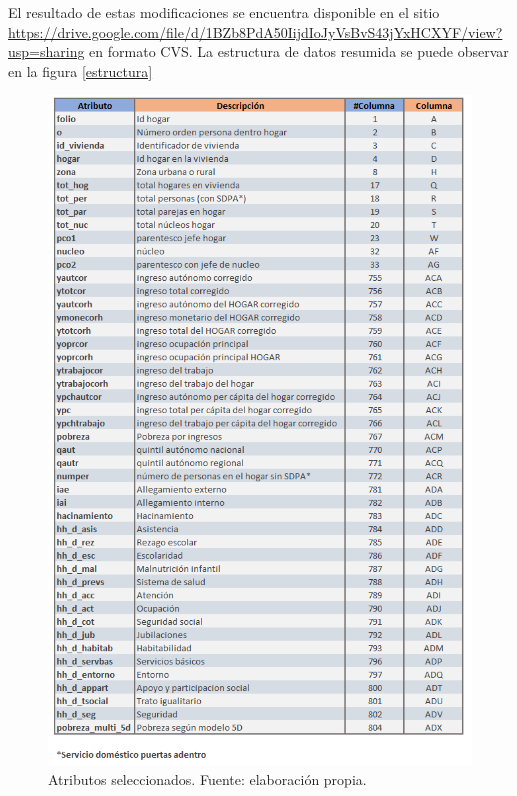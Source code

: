 \documentclass[12pt,letterpaper,spanish]{article}
\begin{document}
El resultado de estas modificaciones se encuentra disponible en el sitio \url{https://drive.google.com/file/d/1BZb8PdA50IijdIoJyVsBvS43jYxHCXYF/view?usp=sharing} en formato CVS. La estructura de datos resumida se puede observar en la figura \ref{estructura}


 \begin{figure} [H]
        \centering
        \includegraphics[height=\textheight]{atributos_casen.png}
        \caption{Atributos seleccionados. Fuente: elaboración propia.}
        \label{atributos}
    \end{figure}
\end{document}
